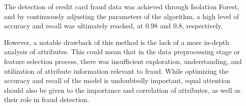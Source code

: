 The detection of credit card fraud data was achieved through Isolation Forest, and by continuously adjusting the parameters of the algorithm, a high level of accuracy and recall was ultimately reached, at 0.98 and 0.8, respectively.

However, a notable drawback of this method is the lack of a more in-depth analysis of attributes. This could mean that in the data preprocessing stage or feature selection process, there was insufficient exploration, understanding, and utilization of attribute information relevant to fraud. While optimizing the accuracy and recall of the model is undoubtedly important, equal attention should also be given to the importance and correlation of attributes, as well as their role in fraud detection.


